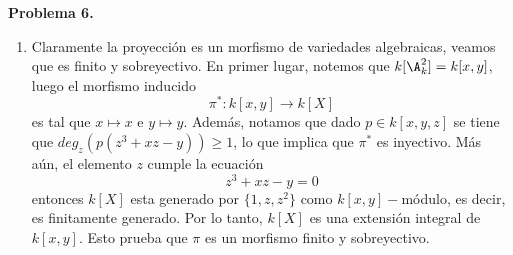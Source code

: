 \documentclass{article}
\begin{document}
\vspace{5mm}
\noindent\textbf{Problema 6.}
\begin{enumerate}
    \item[(a)] Claramente la proyección es un morfismo de variedades algebraicas, veamos que es 
    finito y sobreyectivo. En primer lugar, notemos que $k[\A_{k}^{2}]=k[x,y]$, luego el morfismo 
    inducido
    \begin{equation*}
        \pi^{*}:k[x,y]\to k[X]
    \end{equation*}
    es tal que $x\mapsto x$ e $y\mapsto y$. Además, notamos que dado $p\in k[x,y,z]$ se tiene que
    $deg_{z}(p(z^{3}+xz-y))\geq1$, lo que implica que $\pi^{*}$ es inyectivo. Más aún, el elemento
    $z$ cumple la ecuación
    \begin{equation*}
        z^{3}+xz-y=0
    \end{equation*}
    entonces $k[X]$ esta generado por $\{1,z,z^{2}\}$ como $k[x,y]-$módulo, es decir, es 
    finitamente generado. Por lo tanto, $k[X]$ es una extensión integral de $k[x,y]$. Esto prueba
    que $\pi$ es un morfismo finito y sobreyectivo.
    

\end{enumerate}
\end{document}
